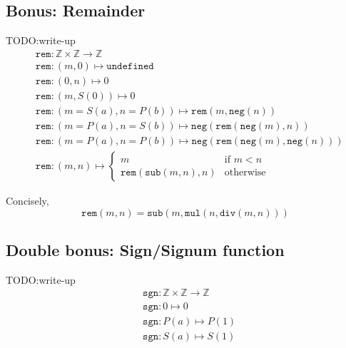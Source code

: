 \documentclass{article}
\newcommand{\Z}{\mathbb{Z}}
\newcommand{\ttneg}{\mathtt{neg}}
\newcommand{\ttsub}{\mathtt{sub}}
\newcommand{\ttmul}{\mathtt{mul}}
\newcommand{\ttdiv}{\mathtt{div}}
\newcommand{\ttrem}{\mathtt{rem}}
\begin{document}
\subsection*{Bonus: Remainder}
TODO:\@{}write-up
\begin{align*}
&{} \ttrem : \Z \times \Z \to \Z \\
&{} \ttrem : (m, 0) \mapsto \mathtt{undefined} \\
&{} \ttrem : (0, n) \mapsto 0 \\
&{} \ttrem : (m, S(0)) \mapsto 0 \\
&{} \ttrem : (m=S(a), n=P(b)) \mapsto \ttrem(m, \ttneg(n)) \\
&{} \ttrem : (m=P(a), n=S(b)) \mapsto \ttneg(\ttrem(\ttneg(m), n)) \\
&{} \ttrem : (m=P(a), n=P(b)) \mapsto \ttneg(\ttrem(\ttneg(m), \ttneg(n))) \\
&{} \ttrem : (m, n) \mapsto \begin{cases}
    m & \text{if } m < n \\
    \ttrem(\ttsub(m, n), n) & \text{otherwise}
\end{cases}
\end{align*}

Concisely,
\[ \ttrem(m, n) = \ttsub(m, \ttmul(n, \ttdiv(m, n))) \]

\subsection*{Double bonus: Sign/Signum function}
TODO:\@{}write-up
\begin{align*}
&{} \mathtt{sgn} : \Z \times \Z \to \Z \\
&{} \mathtt{sgn} : 0 \mapsto 0 \\
&{} \mathtt{sgn} : P(a) \mapsto P(1) \\
&{} \mathtt{sgn} : S(a) \mapsto S(1) \\
\end{align*}
\end{document}
